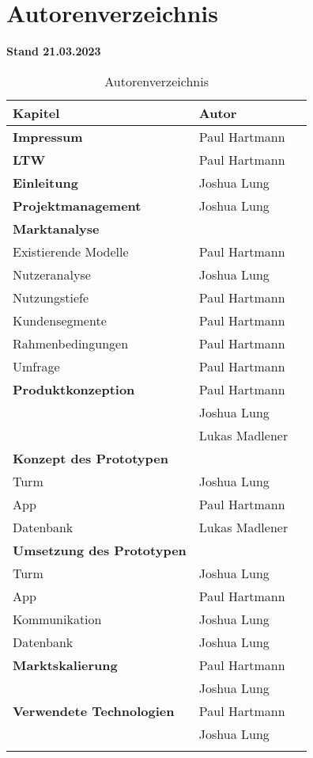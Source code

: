 \section{Autorenverzeichnis}

\textbf{Stand 21.03.2023}

\begin{longtable}{llr}
  \textbf{Kapitel}                  & \textbf{Autor} \\
  \toprule
  \textbf{Impressum}                & Paul Hartmann  \\
  \midrule
  \textbf{LTW}                      & Paul Hartmann  \\
  \midrule
  \textbf{Einleitung}               & Joshua Lung    \\
  \midrule
  \textbf{Projektmanagement}        & Joshua Lung    \\
  \midrule
  \textbf{Marktanalyse}             &                \\
  Existierende Modelle              & Paul Hartmann  \\
  Nutzeranalyse                     & Joshua Lung    \\
  Nutzungstiefe                     & Paul Hartmann  \\
  Kundensegmente                    & Paul Hartmann  \\
  Rahmenbedingungen                 & Paul Hartmann  \\
  Umfrage                           & Paul Hartmann \\
  \midrule
  \textbf{Produktkonzeption}        & Paul Hartmann  \\
                                    & Joshua Lung    \\
                                    & Lukas Madlener \\
  \midrule
  \textbf{Konzept des Prototypen}   &                \\
  Turm                              & Joshua Lung    \\
  App                               & Paul Hartmann  \\
  Datenbank                         & Lukas Madlener \\
  \midrule
  \textbf{Umsetzung des Prototypen} &                \\
  Turm                              & Joshua Lung    \\
  App                               & Paul Hartmann  \\
  Kommunikation                      & Joshua Lung    \\
  Datenbank                         & Joshua Lung    \\
  \midrule
  \textbf{Marktskalierung}          & Paul Hartmann  \\
                                    & Joshua Lung    \\
  \midrule
  \textbf{Verwendete Technologien}  & Paul Hartmann  \\
                                    & Joshua Lung    \\
  \bottomrule

  \caption{Autorenverzeichnis}
  \label{tab:autorenverzeichnis}
\end{longtable}
